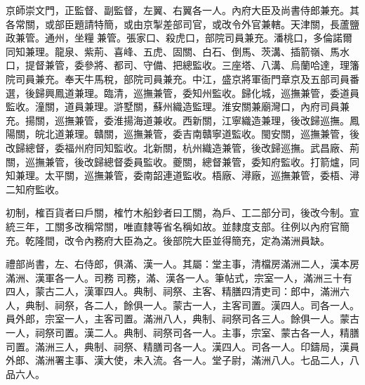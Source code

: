 \begin{pinyinscope}
京師崇文門，正監督、副監督，左翼、右翼各一人。內府大臣及尚書侍郎兼充。其各常關，或部臣題請特簡，或由京掣差部司官，或改令外官兼轄。天津關，長蘆鹽政兼管。通州，坐糧兼管。張家口、殺虎口，部院司員兼充。潘桃口，多倫諾爾同知兼理。龍泉、紫荊、喜峰、五虎、固關、白石、倒馬、茨溝、插箭嶺、馬水口，提督兼管，委參將、都司、守備、把總監收。三座塔、八溝、烏蘭哈達，理籓院司員兼充。奉天牛馬稅，部院司員兼充。中江，盛京將軍衙門章京及五部司員番選，後歸興鳳道兼理。臨清，巡撫兼管，委知州監收。歸化城，巡撫兼管，委道員監收。潼關，道員兼理。滸墅關，蘇州織造監理。淮安關兼廟灣口，內府司員兼充。揚關，巡撫兼管，委淮揚海道兼收。西新關，江寧織造兼理，後改歸巡撫。鳳陽關，皖北道兼理。贛關，巡撫兼管，委吉南贛寧道監收。閩安關，巡撫兼管，後改歸總督，委福州府同知監收。北新關，杭州織造兼管，後改歸巡撫。武昌廠、荊關，巡撫兼管，後改歸總督委員監收。夔關，總督兼管，委知府監收。打箭爐，同知兼理。太平關，巡撫兼管，委南韶連道監收。梧廠、潯廠，巡撫兼管，委梧、潯二知府監收。

初制，榷百貨者曰戶關，榷竹木船鈔者曰工關，為戶、工二部分司，後改今制。宣統三年，工關多改稱常關，唯直隸等省名稱如故。並隸度支部。往例以內府官簡充。乾隆間，改令內務府大臣為之。後部院大臣並得簡充，定為滿洲員缺。

禮部尚書，左、右侍郎，俱滿、漢一人。其屬：堂主事，清檔房滿洲二人，漢本房滿洲、漢軍各一人。司務司務，滿、漢各一人。筆帖式，宗室一人，滿洲三十有四人，蒙古二人，漢軍四人。典制、祠祭、主客、精膳四清吏司：郎中，滿洲六人，典制、祠祭，各二人，餘俱一人。蒙古一人，主客司置。漢四人。司各一人。員外郎，宗室一人，主客司置。滿洲八人，典制、祠祭司各三人。餘俱一人。蒙古一人，祠祭司置。漢二人。典制、祠祭司各一人。主事，宗室、蒙古各一人，精膳司置。滿洲三人，典制、祠祭、精膳司各一人。漢四人。司各一人。印鑄局，漢員外郎、滿洲署主事、漢大使，未入流。各一人。堂子尉，滿洲八人。七品二人，八品六人。


\end{pinyinscope}
